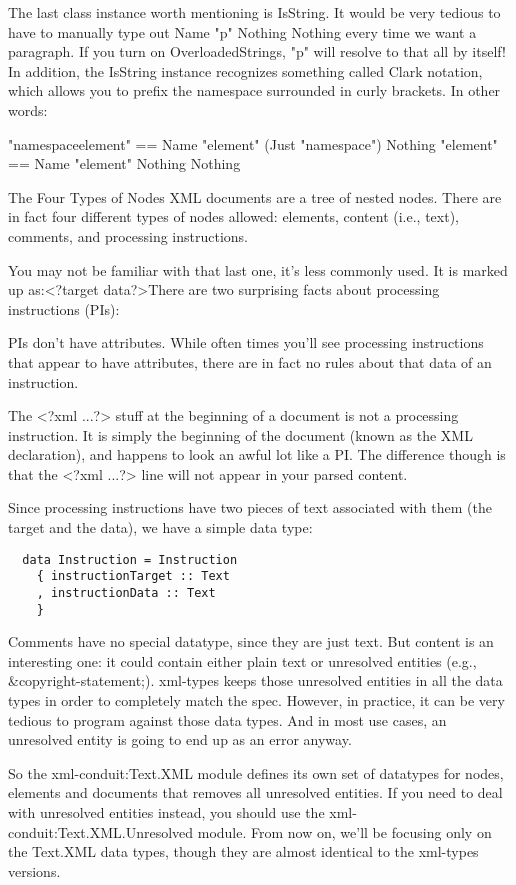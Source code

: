 The last class instance worth mentioning is IsString. It would be
very tedious to have to manually type out Name "p" Nothing Nothing
every time we want a paragraph. If you turn on OverloadedStrings,
"p" will resolve to that all by itself! In addition, the
IsString instance recognizes something called Clark notation, which allows you
to prefix the namespace surrounded in curly brackets. In other words:

"{namespace}element" == Name "element" (Just "namespace") Nothing
"element" == Name "element" Nothing Nothing

The Four Types of Nodes
XML documents are a tree of nested nodes. There are in fact four different types of nodes
allowed: elements, content (i.e., text), comments, and processing instructions.

You may not be familiar with that last one, it's less commonly used. It is marked
up as:<?target data?>There are two surprising facts about processing instructions (PIs):

  PIs don't have attributes. While often times you'll see processing instructions
  that appear to have attributes, there are in fact no rules about that data of an
  instruction.

  The <?xml ...?> stuff at the beginning of a document is not
  a processing instruction. It is simply the beginning of the document (known as the XML
  declaration), and happens to look an awful lot like a PI. The difference though is that the
  <?xml ...?> line will not appear in your parsed content.
   
Since processing instructions have two pieces of text associated with them (the target and the
data), we have a simple data type:

\begin{lstlisting}
  data Instruction = Instruction
    { instructionTarget :: Text
    , instructionData :: Text
    }
\end{lstlisting}

Comments have no special datatype, since they are just text. But content is an
interesting one: it could contain either plain text or unresolved entities (e.g.,
&copyright-statement;). 
xml-types keeps those
unresolved entities in all the data types in order to completely match the spec. However, in
practice, it can be very tedious to program against those data types. And in most use cases, an
unresolved entity is going to end up as an error anyway.

So the xml-conduit:Text.XML module defines its own set
of datatypes for nodes, elements and documents that removes all unresolved entities. If you need
to deal with unresolved entities instead, you should use the xml-conduit:Text.XML.Unresolved module. From now on, we'll be focusing only on the
Text.XML data types, though they are almost identical to the
xml-types versions.

